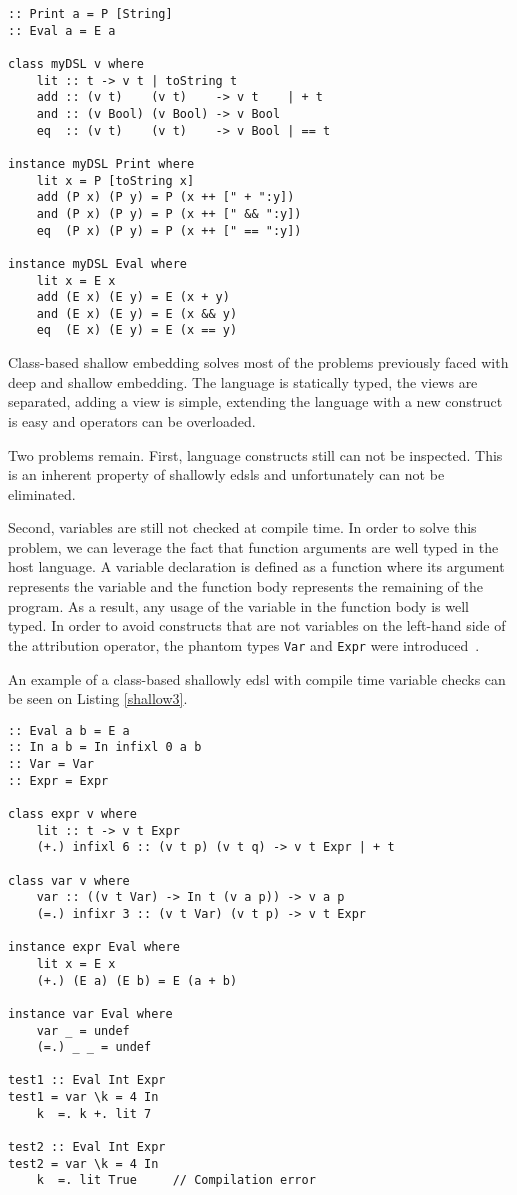 \begin{lstlisting}[caption=A simple shallowly \ac{edsl} with classes,captionpos=b,label=shallow2]
:: Print a = P [String]
:: Eval a = E a

class myDSL v where
    lit :: t -> v t | toString t
    add :: (v t)    (v t)    -> v t    | + t
    and :: (v Bool) (v Bool) -> v Bool
    eq  :: (v t)    (v t)    -> v Bool | == t
    
instance myDSL Print where
    lit x = P [toString x]
    add (P x) (P y) = P (x ++ [" + ":y])
    and (P x) (P y) = P (x ++ [" && ":y])
    eq  (P x) (P y) = P (x ++ [" == ":y])
    
instance myDSL Eval where
    lit x = E x
    add (E x) (E y) = E (x + y)
    and (E x) (E y) = E (x && y)
    eq  (E x) (E y) = E (x == y)
\end{lstlisting}

Class-based shallow embedding solves most of the problems previously faced with deep and shallow embedding. The language is statically typed, the views are separated, adding a view is simple, extending the language with a new construct is easy and operators can be overloaded. 

Two problems remain. First, language constructs still can not be inspected. This is an inherent property of shallowly \acp{edsl} and unfortunately can not be eliminated. 

Second, variables are still not checked at compile time. In order to solve this problem, we can leverage the fact that function arguments are well typed in the host language. A variable declaration is defined as a function where its argument represents the variable and the function body represents the remaining of the program. As a result, any usage of the variable in the function body is well typed. In order to avoid constructs that are not variables on the left-hand side of the attribution operator, the phantom types \texttt{Var} and \texttt{Expr} were introduced~\cite{mtasks}. 

An example of a class-based shallowly \ac{edsl} with compile time variable checks can be seen on Listing \ref{shallow3}.

\begin{lstlisting}[caption=A simple shallowly \ac{edsl} with compile time variable checks,captionpos=b,label=shallow3]
:: Eval a b = E a
:: In a b = In infixl 0 a b
:: Var = Var
:: Expr = Expr

class expr v where
    lit :: t -> v t Expr
    (+.) infixl 6 :: (v t p) (v t q) -> v t Expr | + t

class var v where
	var :: ((v t Var) -> In t (v a p)) -> v a p
	(=.) infixr 3 :: (v t Var) (v t p) -> v t Expr

instance expr Eval where
	lit x = E x
	(+.) (E a) (E b) = E (a + b)

instance var Eval where
	var _ = undef
	(=.) _ _ = undef

test1 :: Eval Int Expr
test1 = var \k = 4 In
	k  =. k +. lit 7

test2 :: Eval Int Expr
test2 = var \k = 4 In
	k  =. lit True     // Compilation error
\end{lstlisting}

